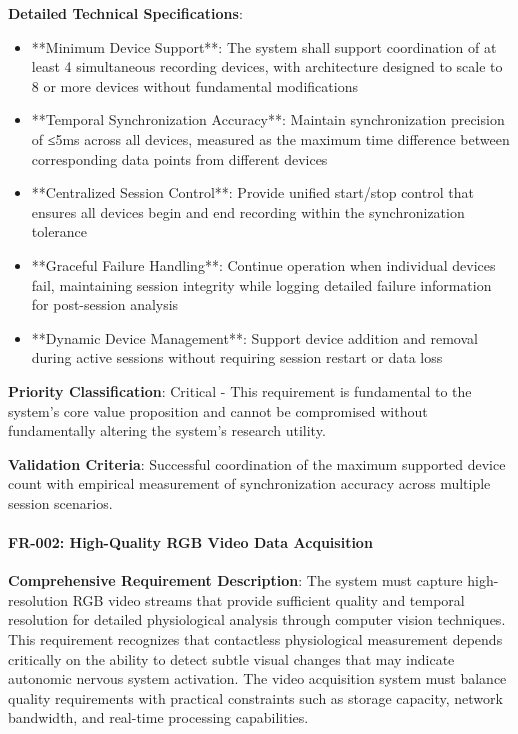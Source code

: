\documentclass[11pt,a4paper]{report}
\begin{document}
\textbf{Detailed Technical Specifications}:

\begin{itemize}
\item **Minimum Device Support**: The system shall support coordination of at least 4 simultaneous recording devices, with
  architecture designed to scale to 8 or more devices without fundamental modifications
\item **Temporal Synchronization Accuracy**: Maintain synchronization precision of ≤5ms across all devices, measured as the
  maximum time difference between corresponding data points from different devices
\item **Centralized Session Control**: Provide unified start/stop control that ensures all devices begin and end recording
  within the synchronization tolerance
\item **Graceful Failure Handling**: Continue operation when individual devices fail, maintaining session integrity while
  logging detailed failure information for post-session analysis
\item **Dynamic Device Management**: Support device addition and removal during active sessions without requiring session
  restart or data loss

\end{itemize}
\textbf{Priority Classification}: Critical - This requirement is fundamental to the system's core value proposition and
cannot be compromised without fundamentally altering the system's research utility.

\textbf{Validation Criteria}: Successful coordination of the maximum supported device count with empirical measurement of
synchronization accuracy across multiple session scenarios.

\paragraph{FR-002: High-Quality RGB Video Data Acquisition}

\textbf{Comprehensive Requirement Description}: The system must capture high-resolution RGB video streams that provide
sufficient quality and temporal resolution for detailed physiological analysis through computer vision techniques. This
requirement recognizes that contactless physiological measurement depends critically on the ability to detect subtle
visual changes that may indicate autonomic nervous system activation. The video acquisition system must balance quality
requirements with practical constraints such as storage capacity, network bandwidth, and real-time processing
capabilities.
\end{document}
